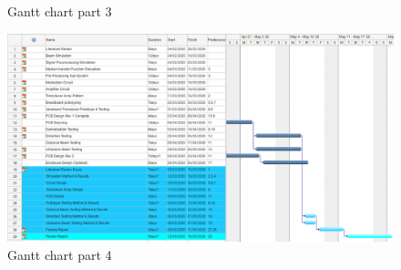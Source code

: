 \begin{appendices}
\begin{figure}[ht]
    \caption{Gantt chart part 3}
    \label{fig:gantt3}
\end{figure}
\begin{figure}[ht]
    \centering
    \includegraphics[width=\textwidth]{Figures/Gantt4.PNG}
    \caption{Gantt chart part 4}
    \label{fig:gantt4}
\end{figure}

\end{appendices}
